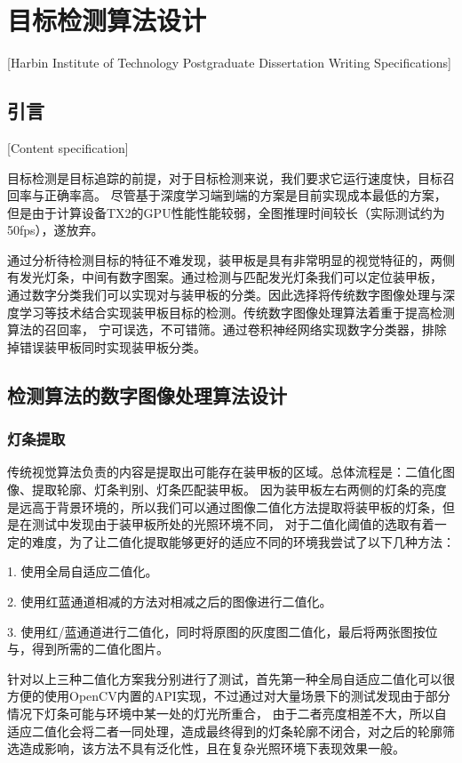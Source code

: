 
\chapter[目标检测算法设计]{目标检测算法设计}[Harbin Institute of Technology Postgraduate Dissertation Writing Specifications]



\section{引言}[Content specification]

目标检测是目标追踪的前提，对于目标检测来说，我们要求它运行速度快，目标召回率与正确率高。
尽管基于深度学习端到端的方案是目前实现成本最低的方案，但是由于计算设备TX2的GPU性能性能较弱，全图推理时间较长（实际测试约为50fps），遂放弃。
\par
通过分析待检测目标的特征不难发现，装甲板是具有非常明显的视觉特征的，两侧有发光灯条，中间有数字图案。通过检测与匹配发光灯条我们可以定位装甲板，
通过数字分类我们可以实现对与装甲板的分类。因此选择将传统数字图像处理与深度学习等技术结合实现装甲板目标的检测。传统数字图像处理算法着重于提高检测算法的召回率，
宁可误选，不可错筛。通过卷积神经网络实现数字分类器，排除掉错误装甲板同时实现装甲板分类。




\section{检测算法的数字图像处理算法设计}

\subsection{灯条提取}
传统视觉算法负责的内容是提取出可能存在装甲板的区域。总体流程是：二值化图像、提取轮廓、灯条判别、灯条匹配装甲板。
因为装甲板左右两侧的灯条的亮度是远高于背景环境的，所以我们可以通过图像二值化方法提取将装甲板的灯条，但是在测试中发现由于装甲板所处的光照环境不同，
对于二值化阈值的选取有着一定的难度，为了让二值化提取能够更好的适应不同的环境我尝试了以下几种方法：\par
1. 使用全局自适应二值化。\par
2. 使用红蓝通道相减的方法对相减之后的图像进行二值化。\par
3. 使用红/蓝通道进行二值化，同时将原图的灰度图二值化，最后将两张图按位与，得到所需的二值化图片。\par

针对以上三种二值化方案我分别进行了测试，首先第一种全局自适应二值化可以很方便的使用OpenCV\cite{bradski2000opencv}内置的API实现，不过通过对大量场景下的测试发现由于部分情况下灯条可能与环境中某一处的灯光所重合，
由于二者亮度相差不大，所以自适应二值化会将二者一同处理，造成最终得到的灯条轮廓不闭合，对之后的轮廓筛选造成影响，该方法不具有泛化性，且在复杂光照环境下表现效果一般。\par

